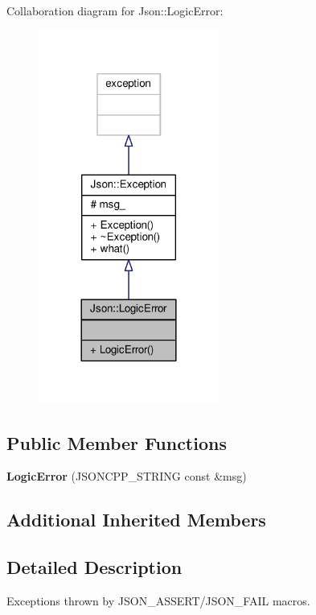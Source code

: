 Collaboration diagram for Json\+:\+:Logic\+Error\+:
\nopagebreak
\begin{figure}[H]
\begin{center}
\leavevmode
\includegraphics[width=168pt]{d5/da0/classJson_1_1LogicError__coll__graph}
\end{center}
\end{figure}
\subsection*{Public Member Functions}
\begin{DoxyCompactItemize}
\item 
{\bfseries Logic\+Error} (J\+S\+O\+N\+C\+P\+P\+\_\+\+S\+T\+R\+I\+NG const \&msg)\hypertarget{classJson_1_1LogicError_acca679aa49768a4a1de7b705c67c2919}{}\label{classJson_1_1LogicError_acca679aa49768a4a1de7b705c67c2919}

\end{DoxyCompactItemize}
\subsection*{Additional Inherited Members}


\subsection{Detailed Description}
Exceptions thrown by J\+S\+O\+N\+\_\+\+A\+S\+S\+E\+R\+T/\+J\+S\+O\+N\+\_\+\+F\+A\+IL macros.

